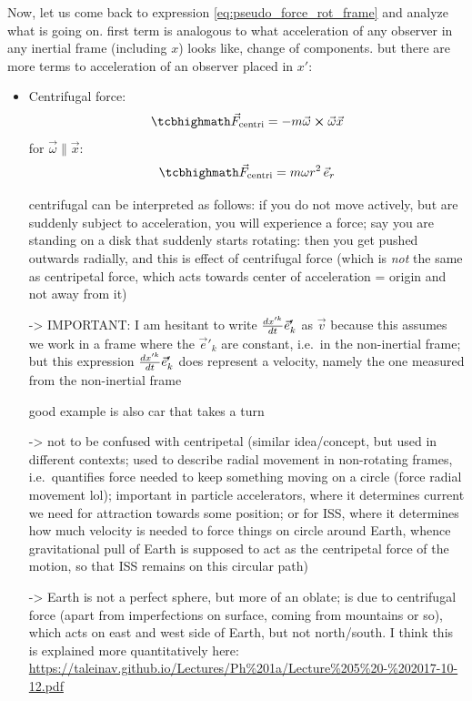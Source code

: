 \documentclass[../class_mech_main.tex]{subfiles}
\begin{document}
Now, let us come back to expression \eqref{eq:pseudo_force_rot_frame} and analyze what is going on. first term is analogous to what acceleration of any observer in any inertial frame (including $x$) looks like, change of components. but there are more terms to acceleration of an observer placed in $x'$:
\begin{itemize}
    \item Centrifugal force:
    \begin{equation}\label{eq:f_centrifugal}
		\eqbox{
			\vec{F}_\mathrm{centri} = - m \vec{\omega} \cross \vec{\omega} \vec{x}
		}
	\end{equation}
	for $\vec{\omega} \parallel \vec{x}$:
	\begin{equation}
		\eqbox{
			\vec{F}_\mathrm{centri} = m \omega r^2 \, \unitvec{r}
		}
	\end{equation}
	
	centrifugal can be interpreted as follows: if you do not move actively, but are suddenly subject to acceleration, you will experience a force; say you are standing on a disk that suddenly starts rotating: then you get pushed outwards radially, and this is effect of centrifugal force (which is \emph{not} the same as centripetal force, which acts towards center of acceleration = origin and not away from it)
    
	-> IMPORTANT: I am hesitant to write $\dv{x'^k}{t} \vec{e}'_k$ as $\vec{v}$ because this assumes we work in a frame where the $\vec{e}'_k$ are constant, i.e.~in the non-inertial frame; but this expression $\dv{x'^k}{t} \vec{e}'_k$ does represent a velocity, namely the one measured from the non-inertial frame
    
    good example is also car that takes a turn
    
    -> not to be confused with centripetal (similar idea/concept, but used in different contexts; used to describe radial movement in non-rotating frames, i.e.~quantifies force needed to keep something moving on a circle (force radial movement lol); important in particle accelerators, where it determines current we need for attraction towards some position; or for ISS, where it determines how much velocity is needed to force things on circle around Earth, whence gravitational pull of Earth is supposed to act as the centripetal force of the motion, so that ISS remains on this circular path)

    -> Earth is not a perfect sphere, but more of an oblate; is due to centrifugal force (apart from imperfections on surface, coming from mountains or so), which acts on east and west side of Earth, but not north/south. I think this is explained more quantitatively here: \url{https://taleinav.github.io/Lectures/Ph%201a/Lecture%205%20-%202017-10-12.pdf}



\end{itemize}
\end{document}
